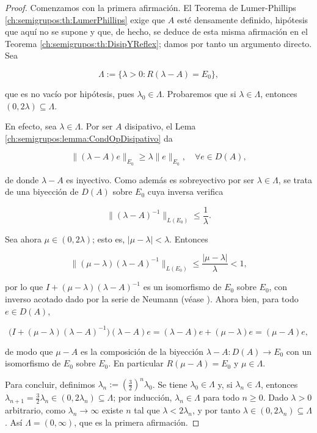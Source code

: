 \begin{proof}
    Comenzamos con la primera afirmación. El Teorema de Lumer-Phillips \ref{ch:semigrupos:th:LumerPhillips} exige que $A$ esté densamente definido, hipótesis que aquí no se supone y que, de hecho, se deduce de esta misma afirmación en el Teorema \ref{ch:semigrupos:th:DisipYReflex}; damos por tanto un argumento directo. Sea

    \[\Lambda := \{\lambda > 0 : R(\lambda - A) = E_0\},\]

    que es no vacío por hipótesis, pues $\lambda_0 \in \Lambda$. Probaremos que si $\lambda \in \Lambda$, entonces $(0, 2\lambda) \subseteq \Lambda$.

    En efecto, sea $\lambda \in \Lambda$. Por ser $A$ disipativo, el Lema \ref{ch:semigrupos:lemma:CondOpDisipativo} da

    \[\lVert (\lambda - A)e \rVert_{E_0} \geq \lambda \lVert e \rVert_{E_0}, \quad \forall e \in D(A),\]

    de donde $\lambda - A$ es inyectivo. Como además es sobreyectivo por ser $\lambda \in \Lambda$, se trata de una biyección de $D(A)$ sobre $E_0$ cuya inversa verifica

    \[\lVert (\lambda - A)^{-1} \rVert_{L(E_0)} \leq \frac{1}{\lambda}.\]

    Sea ahora $\mu \in (0, 2\lambda)$; esto es, $\lvert \mu - \lambda \rvert < \lambda$. Entonces

    \[\lVert (\mu - \lambda)(\lambda - A)^{-1} \rVert_{L(E_0)} \leq \frac{\lvert \mu - \lambda \rvert}{\lambda} < 1,\]

    por lo que $I + (\mu - \lambda)(\lambda - A)^{-1}$ es un isomorfismo de $E_0$ sobre $E_0$, con inverso acotado dado por la serie de Neumann (véase \cite[Teorema~7.3-1]{kreyszig-1978-int-fun-ana}). Ahora bien, para todo $e \in D(A)$,

    \[\big(I + (\mu - \lambda)(\lambda - A)^{-1}\big)(\lambda - A)e = (\lambda - A)e + (\mu - \lambda)e = (\mu - A)e,\]

    de modo que $\mu - A$ es la composición de la biyección $\lambda - A : D(A) \rightarrow E_0$ con un isomorfismo de $E_0$ sobre $E_0$. En particular $R(\mu - A) = E_0$ y $\mu \in \Lambda$.

    Para concluir, definimos $\lambda_n := \left(\tfrac{3}{2}\right)^n \lambda_0$. Se tiene $\lambda_0 \in \Lambda$ y, si $\lambda_n \in \Lambda$, entonces $\lambda_{n+1} = \tfrac{3}{2}\lambda_n \in (0, 2\lambda_n) \subseteq \Lambda$; por inducción, $\lambda_n \in \Lambda$ para todo $n \geq 0$. Dado $\lambda > 0$ arbitrario, como $\lambda_n \rightarrow \infty$ existe $n$ tal que $\lambda < 2\lambda_n$, y por tanto $\lambda \in (0, 2\lambda_n) \subseteq \Lambda$. Así $\Lambda = (0, \infty)$, que es la primera afirmación.


\end{proof}
